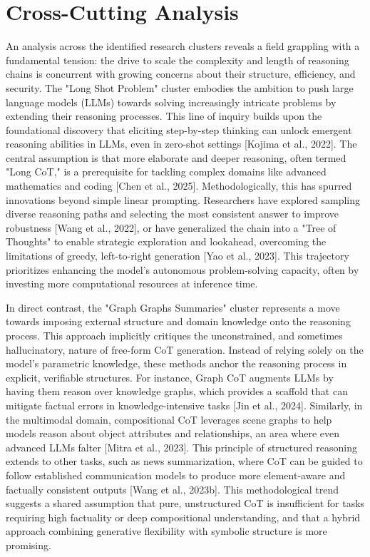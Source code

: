 \documentclass[11pt]{article}
\begin{document}
\section{Cross-Cutting Analysis}
An analysis across the identified research clusters reveals a field grappling with a fundamental tension: the drive to scale the complexity and length of reasoning chains is concurrent with growing concerns about their structure, efficiency, and security. The "Long Shot Problem" cluster embodies the ambition to push large language models (LLMs) towards solving increasingly intricate problems by extending their reasoning processes. This line of inquiry builds upon the foundational discovery that eliciting step-by-step thinking can unlock emergent reasoning abilities in LLMs, even in zero-shot settings [Kojima et al., 2022]. The central assumption is that more elaborate and deeper reasoning, often termed "Long CoT," is a prerequisite for tackling complex domains like advanced mathematics and coding [Chen et al., 2025]. Methodologically, this has spurred innovations beyond simple linear prompting. Researchers have explored sampling diverse reasoning paths and selecting the most consistent answer to improve robustness [Wang et al., 2022], or have generalized the chain into a "Tree of Thoughts" to enable strategic exploration and lookahead, overcoming the limitations of greedy, left-to-right generation [Yao et al., 2023]. This trajectory prioritizes enhancing the model's autonomous problem-solving capacity, often by investing more computational resources at inference time.

In direct contrast, the "Graph Graphs Summaries" cluster represents a move towards imposing external structure and domain knowledge onto the reasoning process. This approach implicitly critiques the unconstrained, and sometimes hallucinatory, nature of free-form CoT generation. Instead of relying solely on the model's parametric knowledge, these methods anchor the reasoning process in explicit, verifiable structures. For instance, Graph CoT augments LLMs by having them reason over knowledge graphs, which provides a scaffold that can mitigate factual errors in knowledge-intensive tasks [Jin et al., 2024]. Similarly, in the multimodal domain, compositional CoT leverages scene graphs to help models reason about object attributes and relationships, an area where even advanced LLMs falter [Mitra et al., 2023]. This principle of structured reasoning extends to other tasks, such as news summarization, where CoT can be guided to follow established communication models to produce more element-aware and factually consistent outputs [Wang et al., 2023b]. This methodological trend suggests a shared assumption that pure, unstructured CoT is insufficient for tasks requiring high factuality or deep compositional understanding, and that a hybrid approach combining generative flexibility with symbolic structure is more promising.
\end{document}
